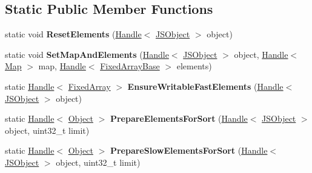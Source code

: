 \subsection*{Static Public Member Functions}
\begin{DoxyCompactItemize}
\item 
\hypertarget{classv8_1_1internal_1_1_j_s_object_a06941b36a42de8e56141f247cd8e179e}{}static void {\bfseries Reset\+Elements} (\hyperlink{classv8_1_1internal_1_1_handle}{Handle}$<$ \hyperlink{classv8_1_1internal_1_1_j_s_object}{J\+S\+Object} $>$ object)\label{classv8_1_1internal_1_1_j_s_object_a06941b36a42de8e56141f247cd8e179e}

\item 
\hypertarget{classv8_1_1internal_1_1_j_s_object_a05e4934b13dffffd69ce05afe5970e22}{}static void {\bfseries Set\+Map\+And\+Elements} (\hyperlink{classv8_1_1internal_1_1_handle}{Handle}$<$ \hyperlink{classv8_1_1internal_1_1_j_s_object}{J\+S\+Object} $>$ object, \hyperlink{classv8_1_1internal_1_1_handle}{Handle}$<$ \hyperlink{classv8_1_1internal_1_1_map}{Map} $>$ map, \hyperlink{classv8_1_1internal_1_1_handle}{Handle}$<$ \hyperlink{classv8_1_1internal_1_1_fixed_array_base}{Fixed\+Array\+Base} $>$ elements)\label{classv8_1_1internal_1_1_j_s_object_a05e4934b13dffffd69ce05afe5970e22}

\item 
\hypertarget{classv8_1_1internal_1_1_j_s_object_ab42042c317fbe6ec6789eb450332d32b}{}static \hyperlink{classv8_1_1internal_1_1_handle}{Handle}$<$ \hyperlink{classv8_1_1internal_1_1_fixed_array}{Fixed\+Array} $>$ {\bfseries Ensure\+Writable\+Fast\+Elements} (\hyperlink{classv8_1_1internal_1_1_handle}{Handle}$<$ \hyperlink{classv8_1_1internal_1_1_j_s_object}{J\+S\+Object} $>$ object)\label{classv8_1_1internal_1_1_j_s_object_ab42042c317fbe6ec6789eb450332d32b}

\item 
\hypertarget{classv8_1_1internal_1_1_j_s_object_af5e8fe09859ae19736d3f094ee257b1d}{}static \hyperlink{classv8_1_1internal_1_1_handle}{Handle}$<$ \hyperlink{classv8_1_1internal_1_1_object}{Object} $>$ {\bfseries Prepare\+Elements\+For\+Sort} (\hyperlink{classv8_1_1internal_1_1_handle}{Handle}$<$ \hyperlink{classv8_1_1internal_1_1_j_s_object}{J\+S\+Object} $>$ object, uint32\+\_\+t limit)\label{classv8_1_1internal_1_1_j_s_object_af5e8fe09859ae19736d3f094ee257b1d}

\item 
\hypertarget{classv8_1_1internal_1_1_j_s_object_a71148c3cb12a09ef75a00b556fac638f}{}static \hyperlink{classv8_1_1internal_1_1_handle}{Handle}$<$ \hyperlink{classv8_1_1internal_1_1_object}{Object} $>$ {\bfseries Prepare\+Slow\+Elements\+For\+Sort} (\hyperlink{classv8_1_1internal_1_1_handle}{Handle}$<$ \hyperlink{classv8_1_1internal_1_1_j_s_object}{J\+S\+Object} $>$ object, uint32\+\_\+t limit)\label{classv8_1_1internal_1_1_j_s_object_a71148c3cb12a09ef75a00b556fac638f}


\end{DoxyCompactItemize}
